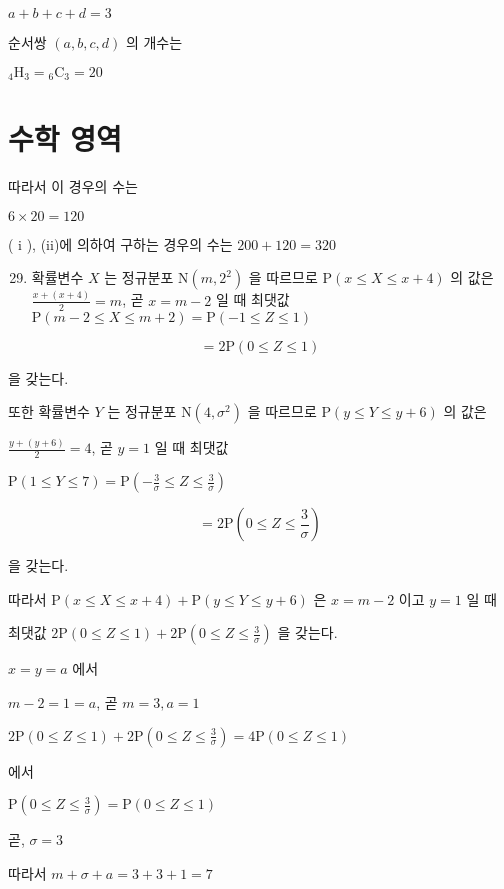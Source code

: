 \documentclass[10pt]{article}
\begin{document}
$a+b+c+d=3$

순서쌍 $(a, b, c, d)$ 의 개수는

${ }_{4} \mathrm{H}_{3}={ }_{6} \mathrm{C}_{3}=20$

\section*{수학 영역}
따라서 이 경우의 수는

$6 \times 20=120$

( i ), (ii)에 의하여 구하는 경우의 수는 $200+120=320$

\begin{enumerate}
  \setcounter{enumi}{28}
  \item 확률변수 $X$ 는 정규분포 $\mathrm{N}\left(m, 2^{2}\right)$ 을 따르므로 $\mathrm{P}(x \leq X \leq x+4)$ 의 값은 $\frac{x+(x+4)}{2}=m$, 곧 $x=m-2$ 일 때 최댓값 $\mathrm{P}(m-2 \leq X \leq m+2)=\mathrm{P}(-1 \leq Z \leq 1)$
\end{enumerate}

\[
=2 \mathrm{P}(0 \leq Z \leq 1)
\]

을 갖는다.

또한 확률변수 $Y$ 는 정규분포 $\mathrm{N}\left(4, \sigma^{2}\right)$ 을 따르므로 $\mathrm{P}(y \leq Y \leq y+6)$ 의 값은

$\frac{y+(y+6)}{2}=4$, 곧 $y=1$ 일 때 최댓값

$\mathrm{P}(1 \leq Y \leq 7)=\mathrm{P}\left(-\frac{3}{\sigma} \leq Z \leq \frac{3}{\sigma}\right)$

\[
=2 \mathrm{P}\left(0 \leq Z \leq \frac{3}{\sigma}\right)
\]

을 갖는다.

따라서 $\mathrm{P}(x \leq X \leq x+4)+\mathrm{P}(y \leq Y \leq y+6)$ 은 $x=m-2$ 이고 $y=1$ 일 때

최댓값 $2 \mathrm{P}(0 \leq Z \leq 1)+2 \mathrm{P}\left(0 \leq Z \leq \frac{3}{\sigma}\right)$ 을 갖는다.

$x=y=a$ 에서

$m-2=1=a$, 곧 $m=3, a=1$

$2 \mathrm{P}(0 \leq Z \leq 1)+2 \mathrm{P}\left(0 \leq Z \leq \frac{3}{\sigma}\right)=4 \mathrm{P}(0 \leq Z \leq 1)$

에서

$\mathrm{P}\left(0 \leq Z \leq \frac{3}{\sigma}\right)=\mathrm{P}(0 \leq Z \leq 1)$

곧, $\sigma=3$

따라서 $m+\sigma+a=3+3+1=7$
\end{document}

